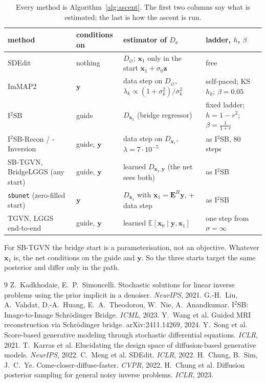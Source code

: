 \documentclass[11pt]{article}
\theoremstyle{remark}
\newcommand{\x}{\bm{x}}
\newcommand{\y}{\bm{y}}
\newcommand{\zz}{\bm{z}}
\newcommand{\cc}{\bm{c}}
\newcommand{\E}{\mathbb{E}}
\newcommand{\Op}{\bm{E}}
\newcommand{\code}[1]{\texttt{#1}}
\newcommand{\Dz}{D_{\varnothing}}
\newcommand{\Dg}{D_{\x_1}}
\newcommand{\Dgy}{D_{\x_1,\y}}
\begin{document}
\begin{table}[H]
\centering
\footnotesize
\begin{tabular}{@{}p{3.6cm}p{2.0cm}p{4.3cm}p{4.6cm}@{}}
\toprule
method & conditions on & estimator of $D_{\cc}$ & ladder, $h$, $\beta$ \\
\midrule
SDEdit & nothing & $\Dz$; $\x_1$ only in the start $\x_1+\sigma_0\zz$ & free \\
ImMAP2 & $\y$ & data step on $\Dz$, $\lambda_k\propto(1+\sigma_k^2)/\sigma_k^2$ &
  self-paced; KS $h_k$; $\beta = 0.05$ \\
I$^2$SB & guide & $\Dg$ (bridge regressor) & fixed ladder; $h = 1-r^2$; $\beta = \frac1{1+r}$ \\
I$^2$SB-Recon / -Inversion & guide, $\y$ & data step on $\Dg$, $\lambda = 7\cdot10^{-5}$ &
  as I$^2$SB, 80 steps \\
SB-TGVN, BridgeLGGS (any start) & guide, $\y$ & learned $\Dgy$ (the net sees both) &
  as I$^2$SB \\
\code{sbunet} (zero-filled start) & $\y$ & $\Dg$ with $\x_1 = \Op^H\y$, + data step & as I$^2$SB \\
TGVN, LGGS end-to-end & guide, $\y$ & learned $\E[\x_0\mid\y,\x_1]$ & one step from
  $\sigma = \infty$ \\
\bottomrule
\end{tabular}
\caption{Every method is Algorithm~\ref{alg:ascent}. The first two columns say what is
estimated; the last is how the ascent is run.}
\label{tab:methods}
\end{table}

For SB-TGVN the bridge start is a parameterisation, not an objective. Whatever $\x_1$ is, the
net conditions on the guide and $\y$. So the three starts target the same posterior and differ
only in the path.

\begin{thebibliography}{9}
Z.~Kadkhodaie, E.~P.~Simoncelli. Stochastic solutions for linear inverse problems using the
prior implicit in a denoiser. \emph{NeurIPS}, 2021.
G.-H.~Liu, A.~Vahdat, D.-A.~Huang, E.~A.~Theodorou, W.~Nie, A.~Anandkumar.
I$^2$SB: Image-to-Image Schr\"odinger Bridge. \emph{ICML}, 2023.
Y.~Wang et al. Guided MRI reconstruction via Schr\"odinger bridge. arXiv:2411.14269, 2024.
Y.~Song et al. Score-based generative modeling through stochastic differential equations.
\emph{ICLR}, 2021.
T.~Karras et al. Elucidating the design space of diffusion-based generative models.
\emph{NeurIPS}, 2022.
C.~Meng et al. SDEdit. \emph{ICLR}, 2022.
H.~Chung, B.~Sim, J.~C.~Ye. Come-closer-diffuse-faster. \emph{CVPR}, 2022.
H.~Chung et al. Diffusion posterior sampling for general noisy inverse problems.
\emph{ICLR}, 2023.
\end{thebibliography}
\end{document}

